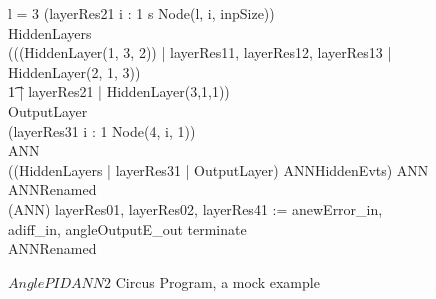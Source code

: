 \documentclass{article}
\begin{document}
\begin{figure}[p]
\begin{circus}
      \lcircguard l = 3 \rcircguard \circguard
      (\lpar \lchanset layerRes21 \rchanset \rpar i : 1 \upto s \circspot Node(l, i, inpSize)) \\%
      
      
      HiddenLayers \circdef \\%
      (((HiddenLayer(1, 3, 2)) \lpar | \lchanset layerRes11, layerRes12, layerRes13 \rchanset | \rpar HiddenLayer(2, 1, 3))  \\%
      \t1 %
      \lpar | \lchanset layerRes21 \rchanset | \rpar HiddenLayer(3,1,1)) \\%
      
      OutputLayer \circdef \\%
      (\lpar \lchanset layerRes31 \rchanset \rpar i : 1  \circspot Node(4, i, 1)) \\%
      
      ANN \circdef \\%
      ((HiddenLayers \lpar | \lchanset layerRes31 \rchanset | \rpar OutputLayer) \circhide ANNHiddenEvts) \circseq ANN \\%
      
      ANNRenamed \circdef \\%
      (ANN) \lcircrename layerRes01, layerRes02, layerRes41 := anewError\_in, adiff\_in, angleOutputE\_out \rcircrename \circinterrupt terminate \then \Skip \\%
      
    \circspot ANNRenamed \\%
  \circend
\end{circus}    


  \caption{$AnglePIDANN2$ Circus Program, a mock example}
  \label{anglepidann2-circus-example}
\end{figure} 
\end{document}
